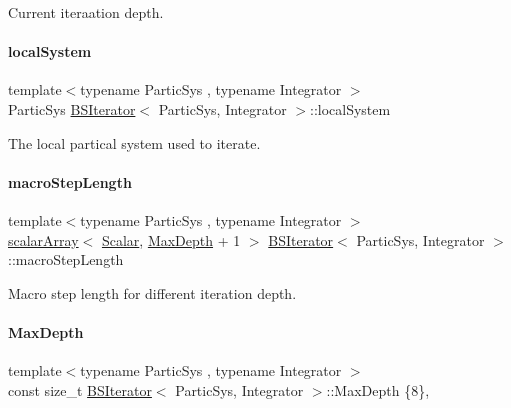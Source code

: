 Current iteraation depth. 

\mbox{\label{class_b_s_iterator_a9d6fc5f237246465161ea86854985395}} 
\paragraph{\texorpdfstring{local\+System}{localSystem}}
{\footnotesize\ttfamily template$<$typename Partic\+Sys , typename Integrator $>$ \\
Partic\+Sys \mbox{\hyperlink{class_b_s_iterator}{B\+S\+Iterator}}$<$ Partic\+Sys, Integrator $>$\+::local\+System\hspace{0.3cm}{\ttfamily [private]}}



The local partical system used to iterate. 

\mbox{\label{class_b_s_iterator_a96c58777cbefe7d02e160317621fc0b9}} 
\paragraph{\texorpdfstring{macro\+Step\+Length}{macroStepLength}}
{\footnotesize\ttfamily template$<$typename Partic\+Sys , typename Integrator $>$ \\
\mbox{\hyperlink{class_b_s_iterator_ab0aa7c10b56500273af05dcd85fd8389}{scalar\+Array}}$<$ \mbox{\hyperlink{class_b_s_iterator_a7857f8ff9032955ea4dcc22cd18ca7a1}{Scalar}}, \mbox{\hyperlink{class_b_s_iterator_a39409b9a12d4854d101ce59a0efc0f74}{Max\+Depth}} + 1 $>$ \mbox{\hyperlink{class_b_s_iterator}{B\+S\+Iterator}}$<$ Partic\+Sys, Integrator $>$\+::macro\+Step\+Length\hspace{0.3cm}{\ttfamily [private]}}



Macro step length for different iteration depth. 

\mbox{\label{class_b_s_iterator_a39409b9a12d4854d101ce59a0efc0f74}} 
\paragraph{\texorpdfstring{Max\+Depth}{MaxDepth}}
{\footnotesize\ttfamily template$<$typename Partic\+Sys , typename Integrator $>$ \\
const size\+\_\+t \mbox{\hyperlink{class_b_s_iterator}{B\+S\+Iterator}}$<$ Partic\+Sys, Integrator $>$\+::Max\+Depth \{8\}\hspace{0.3cm}{\ttfamily [static]}, {\ttfamily [private]}}




